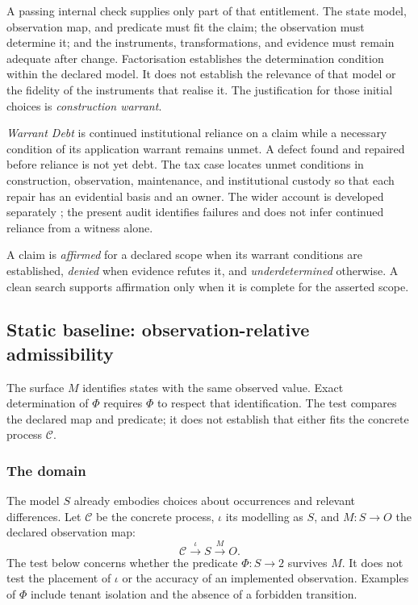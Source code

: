 \documentclass[11pt]{article}
\theoremstyle{definition}
\begin{document}
A passing internal check supplies only part of that entitlement. The state model, observation map, and predicate must fit the claim; the observation must determine it; and the instruments, transformations, and evidence must remain adequate after change. Factorisation establishes the determination condition within the declared model. It does not establish the relevance of that model or the fidelity of the instruments that realise it. The justification for those initial choices is \emph{construction warrant}.

\emph{Warrant Debt} is continued institutional reliance on a claim while a necessary condition of its application warrant remains unmet. A defect found and repaired before reliance is not yet debt. The tax case locates unmet conditions in construction, observation, maintenance, and institutional custody so that each repair has an evidential basis and an owner. The wider account is developed separately \citep{moore2026exactness}; the present audit identifies failures and does not infer continued reliance from a witness alone.

A claim is \emph{affirmed} for a declared scope when its warrant conditions are established, \emph{denied} when evidence refutes it, and \emph{underdetermined} otherwise. A clean search supports affirmation only when it is complete for the asserted scope.

\subsection{Static baseline: observation-relative admissibility}\label{ex:sec:test}

The surface $M$ identifies states with the same observed value. Exact determination of $\Phi$ requires $\Phi$ to respect that identification. The test compares the declared map and predicate; it does not establish that either fits the concrete process $\mathcal{C}$.

\subsubsection{The domain}

The model $S$ already embodies choices about occurrences and relevant differences. Let $\mathcal{C}$ be the concrete process, $\iota$ its modelling as $S$, and $M:S\to O$ the declared observation map:
\[
\mathcal{C} \overset{\iota}{\longrightarrow} S \overset{M}{\longrightarrow} O.
\]
The test below concerns whether the predicate $\Phi:S\to 2$ survives $M$. It does not test the placement of $\iota$ or the accuracy of an implemented observation. Examples of $\Phi$ include tenant isolation and the absence of a forbidden transition.
\end{document}
